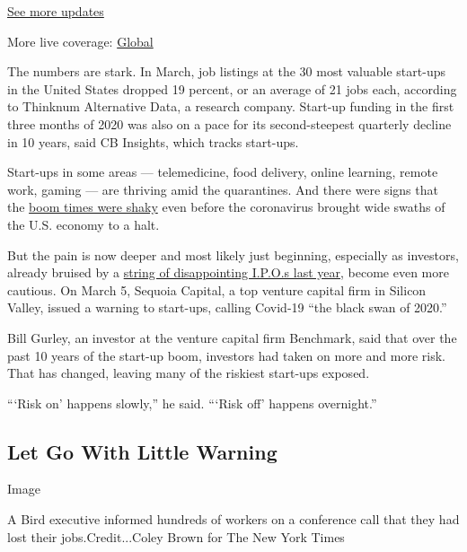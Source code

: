 \href{https://www.nytimes3xbfgragh.onion/live/2020/08/03/business/stock-market-today-coronavirus?action=click\&pgtype=Article\&state=default\&region=MAIN_CONTENT_1\&context=storylines_live_updates}{See
more updates}

More live coverage:
\href{https://www.nytimes3xbfgragh.onion/2020/08/03/world/coronavirus-covid-19.html?action=click\&pgtype=Article\&state=default\&region=MAIN_CONTENT_1\&context=storylines_live_updates}{Global}

The numbers are stark. In March, job listings at the 30 most valuable
start-ups in the United States dropped 19 percent, or an average of 21
jobs each, according to Thinknum Alternative Data, a research company.
Start-up funding in the first three months of 2020 was also on a pace
for its second-steepest quarterly decline in 10 years, said CB Insights,
which tracks start-ups.

Start-ups in some areas --- telemedicine, food delivery, online
learning, remote work, gaming --- are thriving amid the quarantines. And
there were signs that the
\href{https://www.nytimes3xbfgragh.onion/2020/02/24/technology/tech-start-up-boom-deflate.html}{boom
times were shaky} even before the coronavirus brought wide swaths of the
U.S. economy to a halt.

But the pain is now deeper and most likely just beginning, especially as
investors, already bruised by a
\href{https://www.nytimes3xbfgragh.onion/2019/09/26/business/tech-ipo-market.html}{string
of disappointing I.P.O.s last year}, become even more cautious. On March
5, Sequoia Capital, a top venture capital firm in Silicon Valley, issued
a warning to start-ups, calling Covid-19 ``the black swan of 2020.''

Bill Gurley, an investor at the venture capital firm Benchmark, said
that over the past 10 years of the start-up boom, investors had taken on
more and more risk. That has changed, leaving many of the riskiest
start-ups exposed.

```Risk on' happens slowly,'' he said. ```Risk off' happens overnight.''

\hypertarget{let-go-with-little-warning}{%
\subsection{Let Go With Little
Warning}\label{let-go-with-little-warning}}

Image

A Bird executive informed hundreds of workers on a conference call that
they had lost their jobs.Credit...Coley Brown for The New York Times

